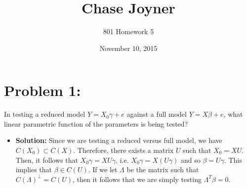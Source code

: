 \documentclass[11pt]{article}
\title{Chase Joyner}
\author{801 Homework 5}
\date{November 10, 2015}
\begin{document}
\maketitle
\section*{Problem 1:}  In testing a reduced model $Y = X_0\gamma + e$ against a full model $Y = X\beta + e$, what linear parametric function of the parameters is being tested?
\begin{itemize}
\item[] {\bf Solution:}  Since we are testing a reduced versus full model, we have $C(X_0) \subset C(X)$.  Therefore, there exists a matrix $U$ such that $X_0 = XU$.  Then, it follows that $X_0\gamma = XU\gamma$, i.e. $X_0\gamma = X(U\gamma)$ and so $\beta = U\gamma$.  This implies that $\beta \in C(U)$.  If we let $\Lambda$ be the matrix such that $C(\Lambda)^\perp = C(U)$, then it follows that we are simply testing $\Lambda^T\beta = 0$.
\end{itemize}
\end{document}
